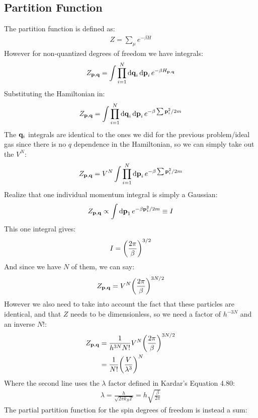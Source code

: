 \documentclass[12pt]{article}
\begin{document}
\subsection{Partition Function}
The partition function is defined as:
\begin{align*}
  Z=\sum_{\mu}e^{-\beta H}
\end{align*}
However for non-quantized degrees of freedom we have integrals:
\begin{align*}
  Z_{\vb{p,q}}=\int\prod_{i=1}^N\dd{\vb{q}}_i\dd{\vb{p}}_ie^{-\beta H_{\vb{p,q}}}
\end{align*}
Substituting the Hamiltonian in:
\begin{align*}
  Z_{\vb{p,q}}=\int\prod_{i=1}^N\dd{\vb{q}}_i\dd{\vb{p}}_i
  e^{-\beta\sum\vb{p}_i^2/2m}
\end{align*}
The $\vb{q}_i$ integrals are identical to the ones we did for the previous problem/ideal gas since there is no $q$ dependence in the Hamiltonian, so we can simply take out the $V^N$:
\begin{align*}
  Z_{\vb{p,q}}=V^N\int\prod_{i=1}^N\dd{\vb{p}}_i
  e^{-\beta\sum\vb{p}_i^2/2m}
\end{align*}
Realize that one individual momentum integral is simply a Gaussian:
\begin{align*}
  Z_{\vb{p,q}}\propto\int\dd{\vb{p}}_1e^{-\beta \vb{p}_1^2/2m}\equiv I
\end{align*}
This one integral gives:
\begin{align*}
  I=\qty(\frac{2\pi}{\beta})^{3/2}
\end{align*}
And since we have $N$ of them, we can say:
\begin{align*}
  Z_{\vb{p,q}}=V^N\qty(\frac{2\pi}{\beta})^{3N/2}
\end{align*}
However we also need to take into account the fact that these particles are identical, and that $Z$ needs to be dimensionless, so we need a factor of $h^{-3N}$ and an inverse $N!$:
\begin{align*}
  Z_{\vb{p,q}}&=\frac1{h^{3N}N!}V^N\qty(\frac{2\pi}{\beta})^{3N/2}\\
  &=\frac1{N!}\qty(\frac{V}{\lambda^3})^N
\end{align*}
Where the second line uses the $\lambda$ factor defined in Kardar's Equation 4.80:
\begin{align*}
  \lambda=\frac{h}{\sqrt{2\pi k_BT}}=h\sqrt{\frac{\beta}{2\pi}}
\end{align*}
The partial partition function for the spin degrees of freedom is instead a sum:
\end{document}
